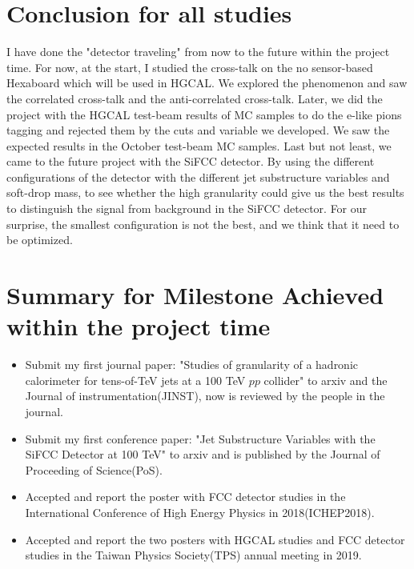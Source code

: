 \documentclass[12pt,twoside,a4paper,an,final]{cms-tdr}
\begin{document}
\section{Conclusion for all studies}
I have done the "detector traveling" from now to the future within the project time. For now, at the start, I studied the cross-talk on the no sensor-based Hexaboard which will be used in HGCAL. We explored the phenomenon and saw the correlated cross-talk and the anti-correlated cross-talk. Later, we did the project with the HGCAL test-beam results of MC samples to do the e-like pions tagging and rejected them by the cuts and variable we developed. We saw the expected results in the October test-beam MC samples. Last but not least, we came to the future project with the SiFCC detector. By using the different configurations of the detector with the different jet substructure variables and soft-drop mass, to see whether the high granularity could give us the best results to distinguish the signal from background in the SiFCC detector. For our surprise, the smallest configuration is not the best, and we think that it need to be optimized. 

\section{Summary for Milestone Achieved within the project time}
\begin{itemize}
\item Submit my first journal paper: "Studies of granularity of a hadronic calorimeter for tens-of-TeV jets at a 100 TeV $pp$ collider" to arxiv and the Journal of instrumentation(JINST), now is reviewed by the people in the journal.
\item Submit my first conference paper: "Jet Substructure Variables with the SiFCC Detector at 100 TeV" to arxiv and is published by the Journal of Proceeding of Science(PoS).
\item Accepted and report the poster with FCC detector studies in the International Conference of High Energy Physics in 2018(ICHEP2018).
\item Accepted and report the two posters with HGCAL studies and FCC detector studies in the Taiwan Physics Society(TPS) annual meeting in 2019. 
\end{itemize}
\end{document}
